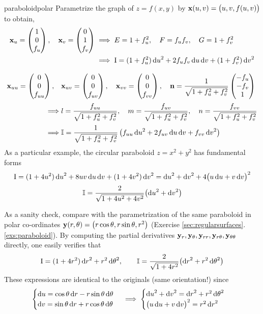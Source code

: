 \begin{example}{}{paraboloidpolar}
	Parametrize the graph of $z=f(x,y)$ by ${\mathbf{x}}(u,v)=\bigl(u,v,f(u,v)\bigr)$ to obtain,
	\begin{gather*}
		\begin{aligned}
		{\mathbf{x}}_u=\begin{pmatrix}1\\0\\f_u\end{pmatrix}, \quad {\mathbf{x}}_v=\begin{pmatrix}0\\1\\f_v\end{pmatrix} &\implies E=1+f_u^2, \quad F=f_uf_v, \quad G=1+f_v^2\\
		&\implies \mathrm{I}=(1+f_u^2)\,{\mathrm{d} u}^2+2f_uf_v\,{\mathrm{d} u}\,{\mathrm{d} v}+(1+f_v^2)\,{\mathrm{d} v}^2
	\end{aligned}\\[8pt]
	\begin{aligned}
		{\mathbf{x}}_{uu}=\begin{pmatrix}0\\0\\f_{uu}\end{pmatrix}, \quad &{\mathbf{x}}_{uv}=\begin{pmatrix}0\\0\\f_{uv}\end{pmatrix}, \quad {\mathbf{x}}_{vv}=\begin{pmatrix}0\\0\\f_{vv}\end{pmatrix}, \quad {\mathbf{n}}=\frac{1}{\sqrt{1+f_u^2+f_v^2}}\begin{pmatrix}-f_u\\-f_v\\1\end{pmatrix}\\[2pt]
		\implies &l=\frac{f_{uu}}{\sqrt{1+f_u^2+f_v^2}}, \quad m=\frac{f_{uv}}{\sqrt{1+f_u^2+f_v^2}}, \quad n=\frac{f_{vv}}{\sqrt{1+f_u^2+f_v^2}}\\[2pt]
		\implies &\mathbb{I}=\frac{1}{\sqrt{1+f_u^2+f_v^2}} \left(f_{uu}\,{\mathrm{d} u}^2 +2f_{uv}\,{\mathrm{d} u}\,{\mathrm{d} v}+
		f_{vv}\,{\mathrm{d} v}^2\right)
	\end{aligned}
	\end{gather*}
	As a particular example, the circular paraboloid $z=x^2+y^2$ has fundamental forms
	\begin{gather*}
		\mathrm{I}=(1+4u^2)\,{\mathrm{d} u}^2+8uv\,{\mathrm{d} u}\,{\mathrm{d} v}+(1+4v^2)\,{\mathrm{d} v}^2 ={\mathrm{d} u}^2+{\mathrm{d} v}^2+4\bigl(u\,{\mathrm{d} u}+v\,{\mathrm{d} v}\bigr)^2\\[2pt]
		\mathbb{I}=\frac{2}{\sqrt{1+4u^2+4v^2}}\bigl({\mathrm{d} u}^2+{\mathrm{d} v}^2\bigr)
	\end{gather*}


	As a sanity check, compare with the parametrization of the same paraboloid in polar co-ordinates ${\mathbf{y}}(r,\theta)=\bigl(r\cos\theta,r\sin\theta,r^2\big)$ (Exercise \ref*{sec:regularsurfaces}.\ref{exs:paraboloid}). By computing the partial derivatives ${\mathbf{y}}_r,{\mathbf{y}}_\theta,{\mathbf{y}}_{rr},{\mathbf{y}}_{r\theta},{\mathbf{y}}_{\theta\theta}$ directly, one easily verifies that
	\begin{gather*}
	\mathrm{I}=(1+4r^2)\,{\mathrm{d} r}^2+r^2\,{\mathrm{d}\theta}^2,\qquad\mathbb{I}=\frac{2}{\sqrt{1+4r^2}}\big({\mathrm{d} r}^2+r^2\,{\mathrm{d}\theta}^2\bigr)
	\end{gather*}
	These expressions are identical to the originals (same orientation!) since
	\[
		\begin{cases}
			{\mathrm{d}u}=\cos\theta\,{\mathrm{d} r}-r\sin\theta\,{\mathrm{d}\theta}\\
			{\mathrm{d} v}=\sin\theta\,{\mathrm{d} r}+r\cos\theta\,{\mathrm{d}\theta}
		\end{cases}
		\implies
		\begin{cases}
			{\mathrm{d}u}^2+{\mathrm{d} v}^2={\mathrm{d} r}^2+r^2\,{\mathrm{d}\theta}^2\\
			\bigl(u\,{\mathrm{d} u}+v\,{\mathrm{d} v}\bigr)^2=r^2\,{\mathrm{d} r}^2\\
		\end{cases} 
  \]
\end{example}

